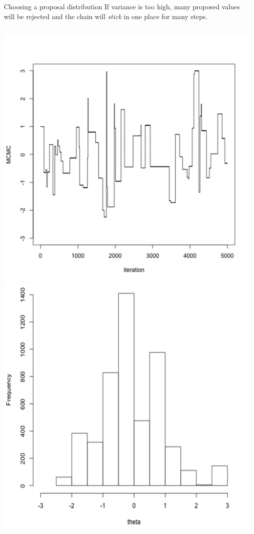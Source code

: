 \documentclass[compress]{beamer}
\begin{document}
\begin{frame}[label=sec-8-4]{Choosing a proposal distribution}
If \alert{variance is too high}, many proposed values will be rejected and the chain will \textit{stick} in one place for many steps.
\begin{columns}[c] 
\includegraphics[width=0.8\linewidth]{Var2}
\includegraphics[width=0.8\linewidth]{Trace2}
\end{columns}  
\end{frame}
\end{document}
